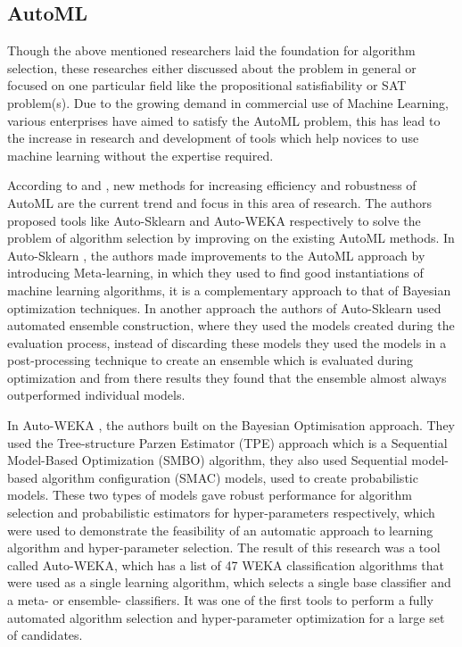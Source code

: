 \subsection*{AutoML}

Though the above mentioned researchers laid the foundation for algorithm selection, these researches either discussed about the problem in general or focused on one particular field like the propositional satisfiability or SAT problem(s). Due to the growing demand in commercial use of Machine Learning, various enterprises have aimed to satisfy the AutoML problem, this has lead to the increase in research and development of tools which help novices to use machine learning without the expertise required.

According to \citep{feurer:m} and \citep{kotthoff:l}, new methods for increasing efficiency and robustness of AutoML are the current trend and focus in this area of research. The authors proposed tools like Auto-Sklearn and Auto-WEKA respectively to solve the problem of algorithm selection by improving on the existing AutoML methods. In Auto-Sklearn \citep{feurer:m}, the authors made improvements to the AutoML approach by introducing Meta-learning, in which they used to find good instantiations of machine learning algorithms, it is a complementary approach to that of Bayesian optimization techniques. In another approach the authors of Auto-Sklearn used automated ensemble construction, where they used the models created during the evaluation process, instead of discarding these models they used the models in a post-processing technique to create an ensemble which is evaluated during optimization and from there results they found that the ensemble almost always outperformed individual models. 

In Auto-WEKA \citep{kotthoff:l}, the authors built on the Bayesian Optimisation approach. They used the Tree-structure Parzen Estimator (TPE) approach which is a Sequential Model-Based Optimization (SMBO) algorithm, they also used Sequential model-based algorithm configuration (SMAC) models,  used to create probabilistic models. These two types of models gave robust performance for algorithm selection and probabilistic estimators for hyper-parameters respectively, which were used to demonstrate the feasibility of an automatic approach to learning algorithm and hyper-parameter selection. The result of this research was a tool called Auto-WEKA, which has a list of 47 WEKA classification algorithms that were used as a single learning algorithm, which selects a single base classifier and a meta- or ensemble- classifiers. It was one of the first tools to perform a fully automated algorithm selection and hyper-parameter optimization for a large set of candidates.

